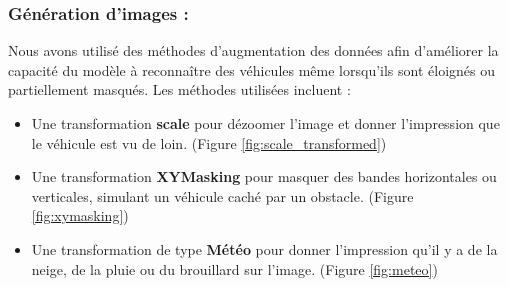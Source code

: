 \subsubsection{Génération d'images :}

Nous avons utilisé des méthodes d'augmentation des données afin d'améliorer la capacité du modèle à reconnaître des véhicules même lorsqu'ils sont éloignés ou partiellement masqués. Les méthodes utilisées incluent :

\begin{itemize}
	\item Une transformation \textbf{scale} pour dézoomer l'image et donner l'impression que le véhicule est vu de loin. (Figure \ref{fig:scale_transformed})
	\item Une transformation \textbf{XYMasking} pour masquer des bandes horizontales ou verticales, simulant un véhicule caché par un obstacle. (Figure \ref{fig:xymasking})
	\item Une transformation de type \textbf{Météo} pour donner l'impression qu'il y a de la neige, de la pluie ou du brouillard sur l'image. (Figure \ref{fig:meteo})
\end{itemize}


